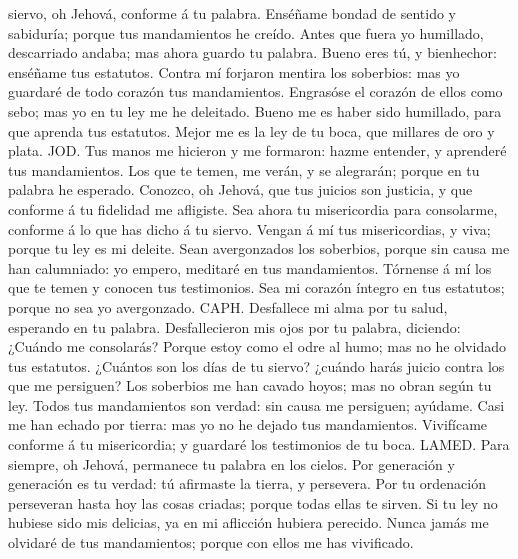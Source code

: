 siervo, oh Jehová, conforme á tu palabra.  Enséñame
bondad de sentido y sabiduría; porque tus mandamientos he creído.
 Antes que fuera yo humillado, descarriado andaba; mas
ahora guardo tu palabra.  Bueno eres tú, y bienhechor:
enséñame tus estatutos.  Contra mí forjaron mentira los
soberbios: mas yo guardaré de todo corazón tus mandamientos.
 Engrasóse el corazón de ellos como sebo; mas yo en tu
ley me he deleitado.  Bueno me es haber sido humillado,
para que aprenda tus estatutos.  Mejor me es la ley de tu
boca, que millares de oro y plata.  JOD. Tus manos me
hicieron y me formaron: hazme entender, y aprenderé tus mandamientos.
 Los que te temen, me verán, y se alegrarán; porque en tu
palabra he esperado.  Conozco, oh Jehová, que tus juicios
son justicia, y que conforme á tu fidelidad me afligiste.
 Sea ahora tu misericordia para consolarme, conforme á lo
que has dicho á tu siervo.  Vengan á mí tus
misericordias, y viva; porque tu ley es mi deleite.  Sean
avergonzados los soberbios, porque sin causa me han calumniado: yo
empero, meditaré en tus mandamientos.  Tórnense á mí los
que te temen y conocen tus testimonios.  Sea mi corazón
íntegro en tus estatutos; porque no sea yo avergonzado. 
CAPH. Desfallece mi alma por tu salud, esperando en tu palabra.
 Desfallecieron mis ojos por tu palabra, diciendo:
¿Cuándo me consolarás?  Porque estoy como el odre al
humo; mas no he olvidado tus estatutos.  ¿Cuántos son los
días de tu siervo? ¿cuándo harás juicio contra los que me persiguen?
 Los soberbios me han cavado hoyos; mas no obran según tu
ley.  Todos tus mandamientos son verdad: sin causa me
persiguen; ayúdame.  Casi me han echado por tierra: mas
yo no he dejado tus mandamientos.  Vivifícame conforme á
tu misericordia; y guardaré los testimonios de tu boca. 
LAMED. Para siempre, oh Jehová, permanece tu palabra en los cielos.
 Por generación y generación es tu verdad: tú afirmaste
la tierra, y persevera.  Por tu ordenación perseveran
hasta hoy las cosas criadas; porque todas ellas te sirven.
 Si tu ley no hubiese sido mis delicias, ya en mi
aflicción hubiera perecido.  Nunca jamás me olvidaré de
tus mandamientos; porque con ellos me has vivificado. 
